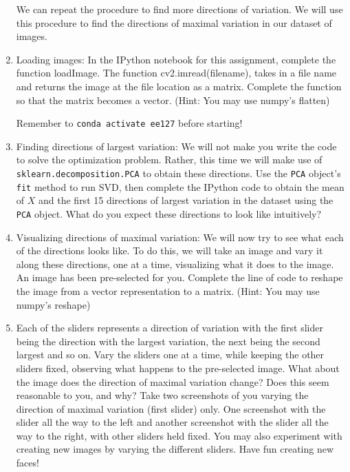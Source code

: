 \begin{enumerate}
    We can repeat the procedure to find more directions of variation. %
    We will use this procedure to find the directions of maximal variation in our dataset of images. 
    \newline
    
    \sol{}
    
\item
     Loading images: In the IPython notebook for this assignment, complete the function loadImage. The function cv2.imread(filename), takes in a file name and returns the image at the file location as a matrix. Complete the function so that the matrix becomes a vector. (Hint: You may use numpy's flatten)
     
     Remember to \texttt{conda activate ee127} before starting! 
    \newline

\sol{}

 \item
    Finding directions of largest variation: We will not make you write the code to solve the optimization problem. Rather, this time we will make use of \texttt{sklearn.decomposition.PCA} to obtain these directions. Use the \texttt{PCA} object's \texttt{fit} method to run SVD, then complete the IPython code to obtain the mean of $X$ and the first 15 directions of largest variation in the dataset using the \texttt{PCA} object. What do you expect these directions to look like intuitively?
    \newline
    
\sol{}

\item
    Visualizing directions of maximal variation: We will now try to see what each of the directions looks like. To do this, we will take an image and vary it along these directions, one at a time, visualizing what it does to the image. An image has been pre-selected for you. Complete the line of code to reshape the image from a vector representation to a matrix. (Hint: You may use numpy's reshape)
    \newline
    
\sol{}
\item
    Each of the sliders represents a direction of variation with the first slider being the direction with the largest variation, the next being the second largest and so on. Vary the sliders one at a time, while keeping the other sliders fixed, observing what happens to the pre-selected image. What about the image does the direction of maximal variation change? Does this seem reasonable to you, and why? Take two screenshots of you varying the direction of maximal variation (first slider) only. One screenshot with the slider all the way to the left and another screenshot with the slider all the way to the right, with other sliders held fixed.  You may also experiment with creating new images by varying the different sliders. Have fun creating new faces!
\sol{}
\end{enumerate}